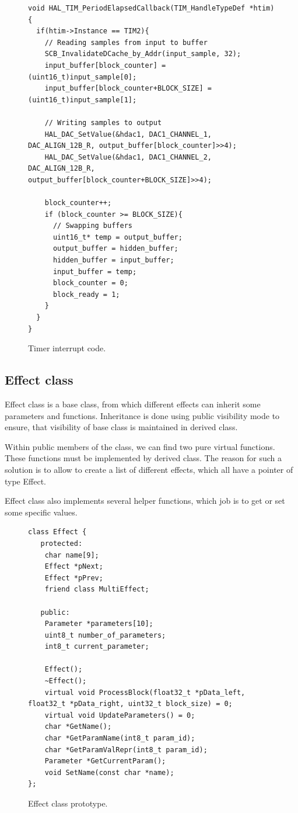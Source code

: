 \documentclass[a4paper,twoside,12pt]{book}
\begin{document}
\begin{figure}[H]
\centering
\begin{lstlisting}
void HAL_TIM_PeriodElapsedCallback(TIM_HandleTypeDef *htim){
  if(htim->Instance == TIM2){
    // Reading samples from input to buffer
    SCB_InvalidateDCache_by_Addr(input_sample, 32);
    input_buffer[block_counter] = (uint16_t)input_sample[0];
    input_buffer[block_counter+BLOCK_SIZE] = (uint16_t)input_sample[1];

    // Writing samples to output
    HAL_DAC_SetValue(&hdac1, DAC1_CHANNEL_1, DAC_ALIGN_12B_R, output_buffer[block_counter]>>4);
    HAL_DAC_SetValue(&hdac1, DAC1_CHANNEL_2, DAC_ALIGN_12B_R, output_buffer[block_counter+BLOCK_SIZE]>>4);

    block_counter++;
    if (block_counter >= BLOCK_SIZE){
      // Swapping buffers
      uint16_t* temp = output_buffer;
      output_buffer = hidden_buffer;
      hidden_buffer = input_buffer;
      input_buffer = temp;
      block_counter = 0;
      block_ready = 1;
    }
  }
}
\end{lstlisting}
\caption{Timer interrupt code.}
\label{fig:timer}
\end{figure}

\subsection{Effect class}
Effect class is a base class, from which different effects can inherit
some parameters and functions.
Inheritance is done using public visibility mode to ensure,
that visibility of base class is maintained in derived class.

Within public members of the class,
we can find two pure virtual functions.
These functions must be implemented by derived class.
The reason for such a solution is to allow
to create a list of different effects, which all have a pointer
of type Effect.

Effect class also implements several helper functions,
which job is to get or set some specific values.

\begin{figure}[H]
\centering
\begin{lstlisting}
class Effect {
   protected:
    char name[9];
    Effect *pNext;
    Effect *pPrev;
    friend class MultiEffect;

   public:
    Parameter *parameters[10];
    uint8_t number_of_parameters;
    int8_t current_parameter;

    Effect();
    ~Effect();
    virtual void ProcessBlock(float32_t *pData_left, float32_t *pData_right, uint32_t block_size) = 0;
    virtual void UpdateParameters() = 0;
    char *GetName();
    char *GetParamName(int8_t param_id);
    char *GetParamValRepr(int8_t param_id);
    Parameter *GetCurrentParam();
    void SetName(const char *name);
};
\end{lstlisting}
\caption{Effect class prototype.}
\label{fig:Effect}
\end{figure}
\end{document}
